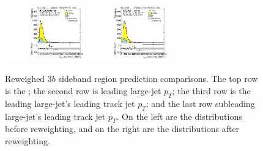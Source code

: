 \begin{figure}[htbp!]
\begin{center}
\includegraphics[width=0.31\textwidth,angle=-90]{figures/boosted/Prereweight/Moriond_ThreeTag_Sideband_sublHCand_trk0_Pt.pdf}
\includegraphics[width=0.31\textwidth,angle=-90]{figures/boosted/Sideband/b77_ThreeTag_Sideband_sublHCand_trk0_Pt.pdf}\\
\caption{Reweighed $3b$ sideband region prediction comparisons. The top row is the \mtwoJ; the second row is leading large-\R jet $p_{T}$; the third row is the leading large-\R jet's leading track jet $p_T$; and the last row subleading large-\R jet's leading track jet $p_T$. On the left are the distributions before reweighting, and on the right are the distributions after reweighting.}
\label{fig:rw-3b-comp-sb}
\end{center}
\end{figure}


